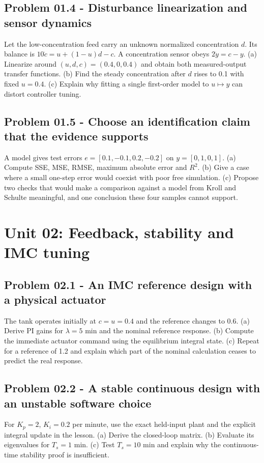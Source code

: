 \documentclass[11pt,a4paper]{article}
\begin{document}
\subsection{Problem 01.4 - Disturbance linearization and sensor dynamics}
Let the low-concentration feed carry an unknown normalized concentration $d$. Its balance is $10\dot c=u+(1-u)d-c$. A concentration sensor obeys $2\dot y=c-y$. (a) Linearize around $(u,d,c)=(0.4,0,0.4)$ and obtain both measured-output transfer functions. (b) Find the steady concentration after $d$ rises to 0.1 with fixed $u=0.4$. (c) Explain why fitting a single first-order model to $u\mapsto y$ can distort controller tuning.

\subsection{Problem 01.5 - Choose an identification claim that the evidence supports}
A model gives test errors $e=[0.1,-0.1,0.2,-0.2]$ on $y=[0,1,0,1]$. (a) Compute SSE, MSE, RMSE, maximum absolute error and $R^2$. (b) Give a case where a small one-step error would coexist with poor free simulation. (c) Propose two checks that would make a comparison against a model from Kroll and Schulte meaningful, and one conclusion these four samples cannot support.


\clearpage\section{Unit 02: Feedback, stability and IMC tuning}
\subsection{Problem 02.1 - An IMC reference design with a physical actuator}
The tank operates initially at $c=u=0.4$ and the reference changes to 0.6. (a) Derive PI gains for $\lambda=5$ min and the nominal reference response. (b) Compute the immediate actuator command using the equilibrium integral state. (c) Repeat for a reference of 1.2 and explain which part of the nominal calculation ceases to predict the real response.

\subsection{Problem 02.2 - A stable continuous design with an unstable software choice}
For $K_p=2$, $K_i=0.2$ per minute, use the exact held-input plant and the explicit integral update in the lesson. (a) Derive the closed-loop matrix. (b) Evaluate its eigenvalues for $T_s=1$ min. (c) Test $T_s=10$ min and explain why the continuous-time stability proof is insufficient.
\end{document}
